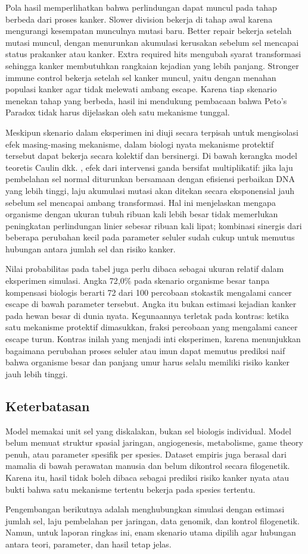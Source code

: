 Pola hasil memperlihatkan bahwa perlindungan dapat muncul pada tahap berbeda
dari proses kanker. Slower division bekerja di tahap awal karena mengurangi
kesempatan munculnya mutasi baru. Better repair bekerja setelah mutasi muncul,
dengan menurunkan akumulasi kerusakan sebelum sel mencapai status prakanker atau
kanker. Extra required hits mengubah syarat transformasi sehingga kanker
membutuhkan rangkaian kejadian yang lebih panjang. Stronger immune control
bekerja setelah sel kanker muncul, yaitu dengan menahan populasi kanker agar
tidak melewati ambang escape. Karena tiap skenario menekan tahap yang
berbeda, hasil ini mendukung pembacaan bahwa Peto's Paradox tidak harus
dijelaskan oleh satu mekanisme tunggal.

Meskipun skenario dalam eksperimen ini diuji secara terpisah untuk mengisolasi
efek masing-masing mekanisme, dalam biologi nyata mekanisme protektif tersebut
dapat bekerja secara kolektif dan bersinergi. Di bawah kerangka model teoretis
Caulin dkk. \cite{caulin2015}, efek dari intervensi ganda bersifat multiplikatif:
jika laju pembelahan sel normal diturunkan bersamaan dengan efisiensi perbaikan
DNA yang lebih tinggi, laju akumulasi mutasi akan ditekan secara eksponensial
jauh sebelum sel mencapai ambang transformasi. Hal ini menjelaskan mengapa
organisme dengan ukuran tubuh ribuan kali lebih besar tidak memerlukan peningkatan
perlindungan linier sebesar ribuan kali lipat; kombinasi sinergis dari beberapa
perubahan kecil pada parameter seluler sudah cukup untuk memutus hubungan antara
jumlah sel dan risiko kanker.

Nilai probabilitas pada tabel juga perlu dibaca sebagai ukuran relatif dalam
eksperimen simulasi. Angka 72{,}0\% pada skenario organisme besar tanpa
kompensasi biologis berarti 72 dari 100
percobaan stokastik mengalami cancer escape di bawah parameter tersebut. Angka
itu bukan estimasi kejadian kanker pada hewan besar di dunia nyata. Kegunaannya
terletak pada kontras: ketika satu mekanisme protektif dimasukkan, fraksi
percobaan yang mengalami cancer escape turun. Kontras inilah yang menjadi
inti eksperimen, karena menunjukkan bagaimana perubahan proses seluler atau
imun dapat memutus prediksi naif bahwa organisme besar dan panjang umur harus
selalu memiliki risiko kanker jauh lebih tinggi.

\subsection{Keterbatasan}

Model memakai unit sel yang diskalakan, bukan sel biologis individual. Model
belum memuat struktur spasial jaringan, angiogenesis, metabolisme, game theory
penuh, atau parameter spesifik per spesies. Dataset empiris juga berasal dari
mamalia di bawah perawatan manusia dan belum dikontrol secara filogenetik.
Karena itu, hasil tidak boleh dibaca sebagai prediksi risiko kanker nyata atau
bukti bahwa satu mekanisme tertentu bekerja pada spesies tertentu.

Pengembangan berikutnya adalah menghubungkan simulasi dengan estimasi jumlah
sel, laju pembelahan per jaringan, data genomik, dan kontrol filogenetik.
Namun, untuk laporan ringkas ini, enam skenario utama dipilih agar hubungan
antara teori, parameter, dan hasil tetap jelas.
